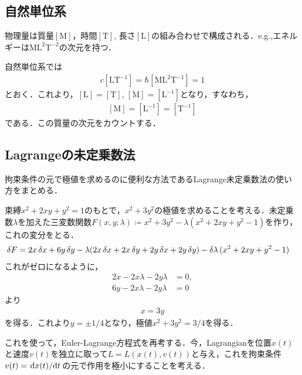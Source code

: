 	\subsection{自然単位系}
	物理量は質量$\mathrm{[M]}$，時間$\mathrm{[T]} $, 長さ$\mathrm{[L]} $の組み合わせで構成される．e.g.,エネルギーは$\mathrm{ML^2T^{-2}} $の次元を持つ．

	自然単位系では
	\begin{align}
			c\mathrm{[LT^{-1}]} = \hbar \mathrm{[ML^2T^{-1}]} = 1
	\end{align}
	とおく．これより，$\mathrm{[L]} = \mathrm{[T]} $, $\mathrm{[M]} = \mathrm{[L^{-1}]} $となり，すなわち，
	\begin{align}
			\mathrm{[M]} = \mathrm{[L^{-1}]} = \mathrm{[T^{-1}]}
	\end{align}
	である．この質量の次元をカウントする．
	\subsection{Lagrangeの未定乗数法}
	拘束条件の元で極値を求めるのに便利な方法であるLagrange未定乗数法の使い方をまとめる．
	\begin{eg}
			束縛$x^2 + 2xy + y^2 = 1$のもとで，$x^2 + 3y^2$の極値を求めることを考える．未定乗数$\lambda$を加えた三変数関数$F(x, y; \lambda) \coloneqq x^2 + 3y^2 - \lambda(x^2 + 2xy + y^2 - 1) $を作り，これの変分をとる．
			\begin{align}
					\var{F}
					&= 2x\var{x} + 6y\var{y} - \lambda(2x\var{x} + 2x\var{y} + 2y\var{x} + 2y\var{y}) - \var{\lambda} (x^2 + 2xy + y^2 - 1)
			\end{align}
			これがゼロになるように，
			\begin{align}
					2x - 2x\lambda - 2y\lambda &= 0,\\
					6y - 2x\lambda - 2y\lambda &= 0
			\end{align}
			より
			\begin{align}
					x = 3y
			\end{align}
			を得る．これより$y = \pm 1/4$となり，極値$x^2 + 3y^2 = 3/4$を得る．
	\end{eg}
	これを使って，Euler-Lagrange方程式を再考する．今，Lagrangianを位置$x(t)$と速度$v(t)$を独立に取って$L = L(x(t), v(t)) $と与え，これを拘束条件$v(t) = \dv*{x(t)}{t}$の元で作用を極小にすることを考える．

